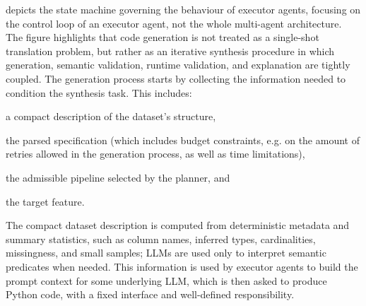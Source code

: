 \documentclass[runningheads]{llncs}
\begin{document}
 depicts the state machine governing the behaviour of executor agents,
focusing on the control loop of an executor agent, 
not the whole multi-agent architecture.
%
The figure highlights that code generation is not treated as a single-shot translation problem,
but rather as an iterative synthesis procedure in which generation,
semantic validation,
runtime validation,
and explanation are tightly coupled.
% 
The generation process starts by collecting the information needed to condition the synthesis task.
%
This includes:
\begin{inlinelist}
  \item a compact description of the dataset's structure,
  \item the parsed specification
  (which includes budget constraints,
  e.g. on the amount of retries allowed in the generation process,
  as well as time limitations),
  \item the admissible pipeline selected by the planner,
  and
  \item the target feature.
\end{inlinelist}
%
The compact dataset description is computed from deterministic metadata and summary statistics, 
such as column names, inferred types, cardinalities, missingness, and small samples; 
\acp{LLM} are used only to interpret semantic predicates when needed.
%
This information is used by executor agents to build the prompt context for some underlying \ac{LLM},
which is then asked to produce Python code,
with a fixed interface and well-defined responsibility.
%
%
\end{document}
